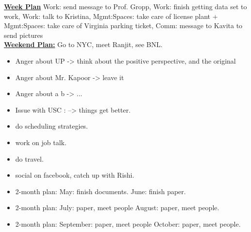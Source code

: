 {\underline{\bf Week Plan}  Work: send message to Prof. Gropp, Work: finish getting data set to work,
        Work: talk to Kristina, Mgmt:Spaces: take care of license
        plant + Mgmt:Spaces: take care of Virginia parking ticket,
        Comm: message to Kavita to send pictures}\\ 
      {\underline{\bf Weekend Plan:} Go to NYC, meet Ranjit, see BNL.}\\

      \begin{itemize}
        \tiny \item \tiny Anger about UP -> think about the positive
        perspective, and the original
      \item \tiny Anger about Mr. Kapoor ->  leave it
      \item \tiny Anger about a b  -> ...
      \item \tiny Issue with USC : --> things get better. 
      \end{itemize}
\begin{minipage}{0.5\textwidth}
\begin{itemize}
\tiny \item \tiny do scheduling strategies.
\item \tiny work on job talk.
\item \tiny do travel.
\item \tiny social on facebook, catch up with Rishi.
\end{itemize}
\begin{itemize}
\item \tiny 2-month plan: May: finish documents.  June:  finish paper.
\item \tiny 2-month plan: July: paper, meet people  August: paper, meet people.
\item \tiny 2-month plan: September: paper, meet people  October:
  paper, meet people.
\end{itemize}
\end{minipage}

